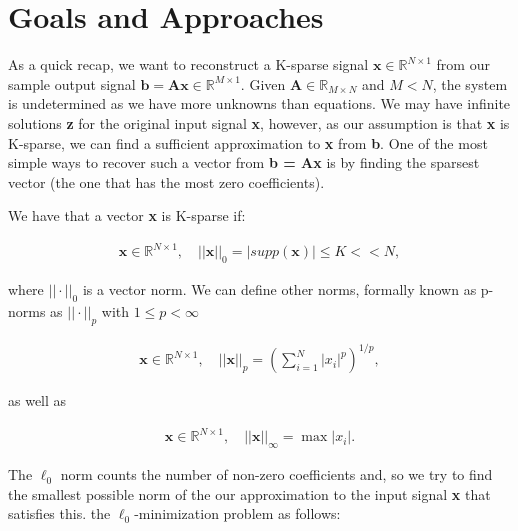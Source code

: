 \documentclass[titlepage,oneside, 12pt]{book}
\theoremstyle{break}
\begin{document}
\section{Goals and Approaches}

As a quick recap, we want to reconstruct a K-sparse signal $\textbf{x} \in \mathbb{R}^{N \times 1}$ from our sample output signal $\textbf{b} = \textbf{Ax} \in \mathbb{R}^{M \times 1}$. Given $\textbf{A} \in \mathbb{R}_{M \times N}$ and $M < N$, the system is undetermined as we have more unknowns than equations. We may have infinite solutions \textbf{z} for the original input signal \textbf{x}, however, as our assumption is that \textbf{x} is K-sparse, we can find a sufficient approximation to \textbf{x} from \textbf{b}. One of the most simple ways to recover such a vector from \textbf{ b = Ax} is by finding the sparsest vector (the one that has the most zero coefficients). 

We have that a vector \textbf{x} is K-sparse if:


\begin{equation}
\begin{gathered}
\textbf{x} \in \mathbb{R}^{N \times 1}, \quad ||\textbf{x}||_{0} = |supp(\textbf{x})| \leq K << N,
\end{gathered}
\label{eqn:sparse}
\end{equation}

where $||\cdot||_{0}$ is a vector norm. We can define other norms, formally known as p-norms as  $||\cdot||_{p}$ with $1 \leq p < \infty$


\begin{equation}
\begin{gathered}
\textbf{x} \in \mathbb{R}^{N \times 1}, \quad ||\textbf{x}||_{p} = (\sum_{i = 1}^{N}|x_{i}|^{p})^{1/p}, 
\end{gathered}
\label{eqn:pnorm}
\end{equation}

as well as

\begin{equation}
\begin{gathered}
\textbf{x} \in \mathbb{R}^{N \times 1}, \quad ||\textbf{x}||_{\infty} = \max |x_{i}|. 
\end{gathered}
\label{eqn:infnorm}
\end{equation}



The $\ell_{0}$ norm counts the number of non-zero coefficients and, so we try to find the smallest possible norm of the our approximation to the input signal \textbf{x} that satisfies this. the $\ell_{0}$-minimization problem as follows:
\end{document}

